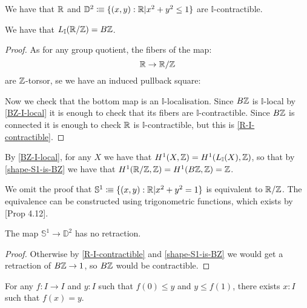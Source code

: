 \begin{corollary}\label{R-I-contractible}
We have that $\mathbb{R}$ and $\mathbb{D}^2\vcentcolon\mspace{-1.2mu}\equiv\{(x,y):\mathbb R\vert x^2+y^2\leq 1\}$ are $\mathbb{I}$-contractible.
\end{corollary}

\begin{proposition}\label{shape-S1-is-BZ}
We have that $L_\mathbb{I}(\mathbb{R}/\mathbb{Z}) = B\mathbb{Z}$.
\end{proposition}

\begin{proof}
As for any group quotient, the fibers of the map:
\[\mathbb{R}\to\mathbb{R}/\mathbb{Z}\]
are $\mathbb{Z}$-torsor, se we have an induced pullback square:
\begin{center}
\end{center}
Now we check that the bottom map is an $\mathbb{I}$-localisation. Since $B\mathbb{Z}$ is $\mathbb{I}$-local by \cref{BZ-I-local} it is enough to check that its fibers are $\mathbb{I}$-contractible. Since $B\mathbb{Z}$ is connected it is enough to check $\mathbb{R}$ is $\mathbb{I}$-contractible, but this is \cref{R-I-contractible}.
\end{proof}

\begin{remark}
By \cref{BZ-I-local}, for any $X$ we have that $H^1(X,\mathbb{Z}) = H^1(L_{\mathbb{I}}(X),\mathbb{Z})$, so that by \cref{shape-S1-is-BZ} we have that $H^1(\mathbb{R}/\mathbb{Z},\mathbb{Z}) = H^1(B\mathbb{Z},\mathbb{Z}) = \mathbb{Z}$.
\end{remark}

We omit the proof that $\mathbb{S}^1\vcentcolon\mspace{-1.2mu}\equiv\{(x,y):\mathbb{R}\vert x^2+y^2=1\}$ is equivalent to $\mathbb{R}/\mathbb{Z}$.
The equivalence can be constructed using trigonometric functions, which exists by \cite{Bishop}[Prop 4.12].

\begin{proposition}
\label{no-retraction}
The map $\mathbb{S}^1\to \mathbb{D}^2$ has no retraction.
\end{proposition}

\begin{proof}
Otherwise by \cref{R-I-contractible} and \cref{shape-S1-is-BZ} we would get a retraction of $B\mathbb{Z}\to 1$, so $B\mathbb{Z}$ would be contractible.
\end{proof}

\begin{theorem}
  \label{ivt}
  For any $f: I\to I$ and $y:I$ such that $f(0)\leq y$ and $y\leq f(1)$,
  there exists $x:I$ such that $f(x)=y$.
\end{theorem}

